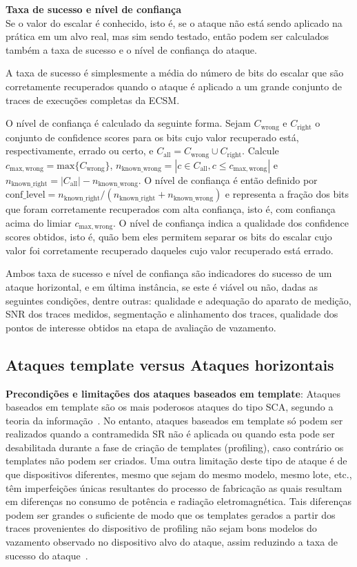 \noindent \textbf{Taxa de sucesso e nível de confiança}\\
Se o valor do escalar é conhecido, isto é, se o ataque não está sendo aplicado na prática em um alvo real, mas sim sendo testado, então podem ser calculados também a taxa de sucesso e o nível de confiança do ataque. 

\noindent A taxa de sucesso é simplesmente a média do número de bits do escalar que são corretamente recuperados quando o ataque é aplicado a um grande conjunto de traces de execuções completas da ECSM.

\noindent O nível de confiança é calculado da seguinte forma. Sejam $C_\mathrm{wrong}$ e $C_\mathrm{right}$ o conjunto de confidence scores para os bits cujo valor recuperado está, respectivamente, errado ou certo, e $C_\mathrm{all} = C_\mathrm{wrong} \cup C_\mathrm{right} $.
%
Calcule $c_\mathrm{max,wrong} = \mathrm{max}\{C_\mathrm{wrong}\}$, $n_\mathrm{known\_wrong} = |{c \in C_\mathrm{all}, c\leq c_\mathrm{max,wrong}}|$  e $n_\mathrm{known\_right} = |C_\mathrm{all}| - n_\mathrm{known\_wrong}$.
%
O nível de confiança é então definido por $\mathrm{conf\_level} = n_\mathrm{known\_right} / (n_\mathrm{known\_right} + n_\mathrm{known\_wrong})$ e representa a fração dos bits que foram corretamente recuperados com alta confiança, isto é, com confiança acima do limiar $c_\mathrm{max,wrong}$.
%
O nível de confiança indica a qualidade dos confidence scores obtidos, isto é, quão bem eles permitem separar os bits do escalar cujo valor foi corretamente recuperado daqueles cujo valor recuperado está errado. 

\noindent Ambos taxa de sucesso e nível de confiança são indicadores do sucesso de um ataque horizontal, e em última instância, se este é viável ou não, dadas as seguintes condições, dentre outras: qualidade e adequação do aparato de medição, SNR dos traces medidos, segmentação e alinhamento dos traces, qualidade dos pontos de interesse obtidos na etapa de avaliação de vazamento.

\subsection{Ataques template versus Ataques horizontais}

\noindent \textbf{Precondições e limitações dos ataques baseados em template}: Ataques baseados em template são os mais poderosos ataques do tipo SCA, segundo a teoria da informação~\cite{ChariRaoRohatgi2003}. No entanto, ataques baseados em template só podem ser realizados quando a contramedida SR não é aplicada ou quando esta pode ser desabilitada durante a fase de criação de templates (profiling), caso contrário os templates não podem ser criados. Uma outra limitação deste tipo de ataque é de que dispositivos diferentes, mesmo que sejam do mesmo modelo, mesmo lote, etc., têm imperfeições únicas resultantes do processo de fabricação as quais resultam em diferenças no consumo de potência e radiação eletromagnética. Tais diferenças podem ser grandes o suficiente de modo que os templates gerados a partir dos traces provenientes do dispositivo de profiling não sejam bons modelos do vazamento observado no dispositivo alvo do ataque, assim reduzindo a taxa de sucesso do ataque~\cite{ElaabidGuilley2012}.


